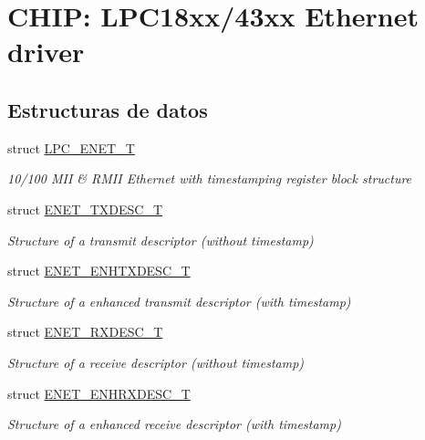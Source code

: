 \hypertarget{group___e_n_e_t__18_x_x__43_x_x}{}\section{C\+H\+IP\+: L\+P\+C18xx/43xx Ethernet driver}
\label{group___e_n_e_t__18_x_x__43_x_x}
\subsection*{Estructuras de datos}
\begin{DoxyCompactItemize}
\item 
struct \hyperlink{struct_l_p_c___e_n_e_t___t}{L\+P\+C\+\_\+\+E\+N\+E\+T\+\_\+T}
\begin{DoxyCompactList}\small\item\em 10/100 M\+II \& R\+M\+II Ethernet with timestamping register block structure \end{DoxyCompactList}\item 
struct \hyperlink{struct_e_n_e_t___t_x_d_e_s_c___t}{E\+N\+E\+T\+\_\+\+T\+X\+D\+E\+S\+C\+\_\+T}
\begin{DoxyCompactList}\small\item\em Structure of a transmit descriptor (without timestamp) \end{DoxyCompactList}\item 
struct \hyperlink{struct_e_n_e_t___e_n_h_t_x_d_e_s_c___t}{E\+N\+E\+T\+\_\+\+E\+N\+H\+T\+X\+D\+E\+S\+C\+\_\+T}
\begin{DoxyCompactList}\small\item\em Structure of a enhanced transmit descriptor (with timestamp) \end{DoxyCompactList}\item 
struct \hyperlink{struct_e_n_e_t___r_x_d_e_s_c___t}{E\+N\+E\+T\+\_\+\+R\+X\+D\+E\+S\+C\+\_\+T}
\begin{DoxyCompactList}\small\item\em Structure of a receive descriptor (without timestamp) \end{DoxyCompactList}\item 
struct \hyperlink{struct_e_n_e_t___e_n_h_r_x_d_e_s_c___t}{E\+N\+E\+T\+\_\+\+E\+N\+H\+R\+X\+D\+E\+S\+C\+\_\+T}
\begin{DoxyCompactList}\small\item\em Structure of a enhanced receive descriptor (with timestamp) \end{DoxyCompactList}\end{DoxyCompactItemize}
